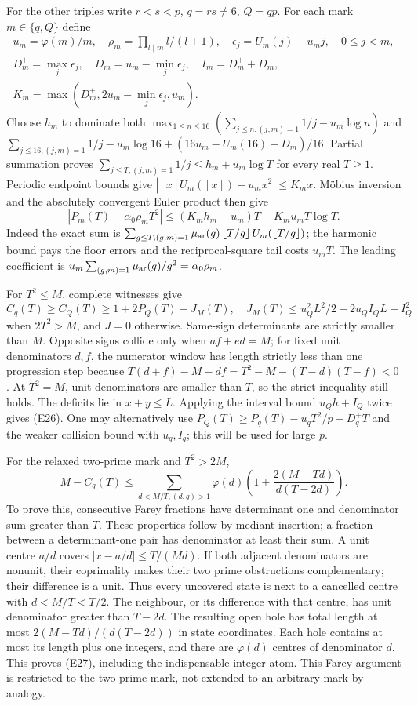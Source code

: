 \documentclass[11pt]{article}
\theoremstyle{definition}\newtheorem{definition}[theorem]{Definition}
\theoremstyle{remark}\newtheorem{remark}[theorem]{Remark}
\newcommand{\floor}[1]{\left\lfloor #1\right\rfloor}
\begin{document}
For the other triples write \(r<s<p\), \(q=rs\ne6\), \(Q=qp\).
For each mark \(m\in\{q,Q\}\) define
\[
\begin{gathered}
 u_m=\varphi(m)/m,\quad \rho_m=\prod_{l\mid m}l/(l+1),\quad
 \epsilon_j=U_m(j)-u_mj,\quad0\le j<m,\\
 D_m^+=\max_j\epsilon_j,\quad D_m^-=u_m-\min_j\epsilon_j,\quad
 I_m=D_m^++D_m^-,\\
 K_m=\max(D_m^+,2u_m-\min_j\epsilon_j,u_m).
\end{gathered}
\]
Choose \(h_m\) to dominate both
\(\max_{1\le n\le16}(\sum_{j\le n,(j,m)=1}1/j-u_m\log n)\) and
\(\sum_{j\le16,(j,m)=1}1/j-u_m\log16
 +(16u_m-U_m(16)+D_m^+)/16\).
Partial summation proves
\(\sum_{j\le T,(j,m)=1}1/j\le h_m+u_m\log T\) for every real \(T\ge1\).
Periodic endpoint bounds give
\(|\floor x U_m(\floor x)-u_mx^2|\le K_mx\).
M\"obius inversion and the absolutely convergent Euler product then give
\[
 |P_m(T)-\alpha_0\rho_mT^2|
 \le(K_mh_m+u_m)T+K_mu_mT\log T .                                  \tag{E25}
\]
Indeed the exact sum is
\(\sum_{g\le T,(g,m)=1}\mu_{\rm ar}(g)
 \floor{T/g}U_m(\floor{T/g})\);
the harmonic bound pays the floor errors and the reciprocal-square
tail costs \(u_mT\). The leading coefficient is
\(u_m\sum_{(g,m)=1}\mu_{\rm ar}(g)/g^2=\alpha_0\rho_m\).

For \(T^2\le M\), complete witnesses give
\[
 C_q(T)\ge C_Q(T)\ge1+2P_Q(T)-J_M(T),\quad
 J_M(T)\le u_Q^2L^2/2+2u_QI_QL+I_Q^2                             \tag{E26}
\]
when \(2T^2>M\), and \(J=0\) otherwise. Same-sign determinants are
strictly smaller than \(M\). Opposite signs collide only when
\(af+ed=M\); for fixed unit denominators \(d,f\), the numerator
window has length strictly less than one progression step because
\(T(d+f)-M-df=T^2-M-(T-d)(T-f)<0\).
At \(T^2=M\), unit denominators are smaller than \(T\), so the strict
inequality still holds. The deficits lie in \(x+y\le L\). Applying
the interval bound \(u_Qh+I_Q\) twice gives (E26).
One may alternatively use
\(P_Q(T)\ge P_q(T)-u_qT^2/p-D_q^+T\) and the weaker collision
bound with \(u_q,I_q\); this will be used for large \(p\).

For the relaxed two-prime mark and \(T^2>2M\),
\[
 M-C_q(T)\le\sum_{d<M/T,(d,q)>1}\varphi(d)
       \left(1+\frac{2(M-Td)}{d(T-2d)}\right).                     \tag{E27}
\]
To prove this, consecutive Farey fractions have determinant one and
denominator sum greater than \(T\). These properties follow by
mediant insertion; a fraction between a determinant-one pair has
denominator at least their sum. A unit centre \(a/d\) covers
\(|x-a/d|\le T/(Md)\). If both adjacent denominators are nonunit,
their coprimality makes their two prime obstructions complementary;
their difference is a unit. Thus every uncovered state is next to a
cancelled centre with \(d<M/T<T/2\). The neighbour, or its difference
with that centre, has unit denominator greater than \(T-2d\).
The resulting open hole has total length at most
\(2(M-Td)/(d(T-2d))\) in state coordinates. Each hole contains at
most its length plus one integers, and there are \(\varphi(d)\)
centres of denominator \(d\). This proves (E27), including the
indispensable integer atom. This Farey argument is restricted to the
two-prime mark, not extended to an arbitrary mark by analogy.
\end{document}
